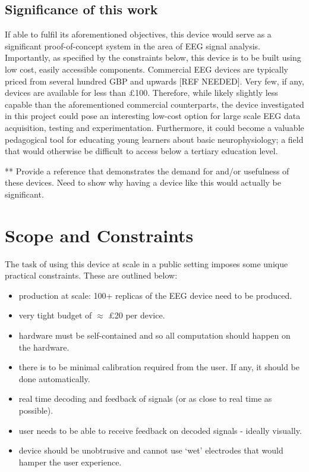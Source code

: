 \subsection{Significance of this work}
If able to fulfil its aforementioned objectives, this device would serve as a significant proof-of-concept system in the area of EEG signal analysis. Importantly, as specified by the constraints below, this device is to be built using low cost, easily accessible components. Commercial EEG devices are typically priced from several hundred GBP and upwards [REF NEEDED]. Very few, if any, devices are available for less than £100. Therefore, while likely slightly less capable than the aforementioned commercial counterparts, the device investigated in this project could pose an interesting low-cost option for large scale EEG data acquisition, testing and experimentation. Furthermore, it could become a valuable pedagogical tool for educating young learners about basic neurophysiology; a field that would otherwise be difficult to access below a tertiary education level.

** Provide a reference that demonstrates the demand for and/or usefulness of these devices. Need to show why having a device like this would actually be significant.

\section{Scope and Constraints}
The task of using this device at scale in a public setting imposes some unique practical constraints. These are outlined below:
\begin{itemize}
    \item production at scale: 100+ replicas of the EEG device need to be produced.
    \item very tight budget of $\approx$ £20 per device.
    \item hardware must be self-contained and so all computation should happen on the hardware. 
    \item there is to be minimal calibration required from the user. If any, it should be done automatically.
    \item real time decoding and feedback of signals (or as close to real time as possible).
    \item user needs to be able to receive feedback on decoded signals - ideally visually.
    \item device should be unobtrusive and cannot use `wet' electrodes that would hamper the user experience.
\end{itemize}

